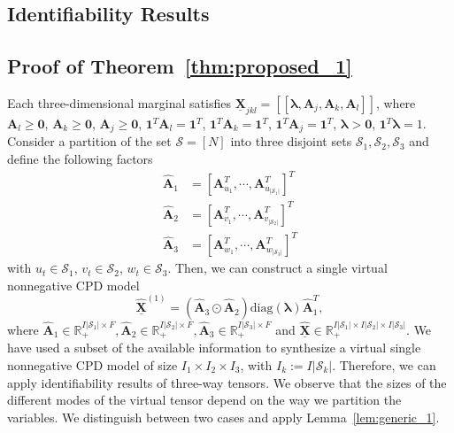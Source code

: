 \documentclass[journal]{IEEEtran}
\begin{document}
\begin{appendices}
\section{Identifiability Results}
\label{ap:ident_results}

\subsection{Proof of Theorem~\ref{thm:proposed_1}}

Each  {three-dimensional marginal satisfies} $\underline{\mathbf{X}}_{jkl} = [\![ \boldsymbol{\lambda},\mathbf{A}_j,\mathbf{A}_k,\mathbf{A}_l ]\!]$, where $\mathbf{A}_l \geq \mathbf{0}$, $\mathbf{A}_k \geq \mathbf{0}$, $\mathbf{A}_j \geq \mathbf{0}$, $\mathbf{1}^T \mathbf{A}_l = \mathbf{1}^T$, $\mathbf{1}^T \mathbf{A}_k = \mathbf{1}^T$, $\mathbf{1}^T \mathbf{A}_j = \mathbf{1}^T$, $\boldsymbol{\lambda} > \mathbf{0} $, $\mathbf{1}^T \boldsymbol{\lambda} = 1$.
Consider a partition of the set $\mathcal{S} = [N]$ into three disjoint sets $\mathcal{S}_1,\mathcal{S}_2,\mathcal{S}_3$ and define the following factors
\begin{equation}
\begin{aligned}
	\widehat{\mathbf{A}}_1 &=  [\mathbf{A}_{u_1}^T, \cdots, \mathbf{A}_{u_{|\mathcal{S}_1|}}^T ]^T  \\
	\widehat{\mathbf{A}}_2 &= [ \mathbf{A}_{v_1}^T, \cdots, \mathbf{A}_{v_{|\mathcal{S}_2|}}^T ]^T \\
	\widehat{\mathbf{A}}_3 &= [ \mathbf{A}_{w_1}^T, \cdots,\mathbf{A}_{w_{|\mathcal{S}_3|}}^T ]^T
\end{aligned}
\end{equation}
with $u_t \in \mathcal{S}_1$, $v_t \in \mathcal{S}_2$, $w_t \in \mathcal{S}_3$. Then, we can construct a  single virtual nonnegative CPD model
\begin{equation}
\underline{\widehat{\mathbf{X}}}^{(1)} = (\widehat{\mathbf{A}}_3 \odot \widehat{\mathbf{A}}_2) \textrm{diag}(\boldsymbol{\lambda})\widehat{\mathbf{A}}_1^T,
\end{equation} 
where $\widehat{\mathbf{A}}_1 \in \mathbb{R}_+^{I|\mathcal{S}_1| \times F}, \widehat{\mathbf{A}}_2 \in \mathbb{R}_+^{I|\mathcal{S}_2| \times F}, \widehat{\mathbf{A}}_3 \in \mathbb{R}_+^{I|\mathcal{S}_3| \times F}$ and $ \underline{\widehat{\mathbf{X}}} \in \mathbb{R}_+^{I |\mathcal{S}_1| \times I |\mathcal{S}_2| \times I |\mathcal{S}_3|}$.
We have used a subset of the available information to synthesize a virtual single nonnegative CPD model of size $I_1 \times I_2 \times I_3$, with $I_k := I|\mathcal{S}_k|$. 
Therefore, we can apply identifiability results of  {three-way} tensors. We observe that the sizes of the different modes of the virtual tensor depend on the way we partition the variables. We distinguish between two cases and apply Lemma~\ref{lem:generic_1}.


\end{appendices}
\end{document}
